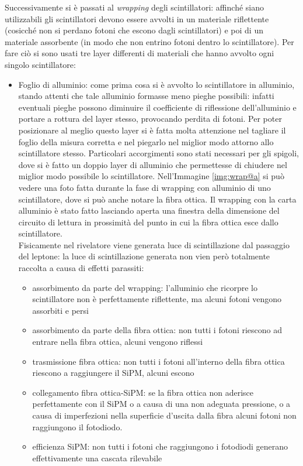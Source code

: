 Successivamente si è passati al \textit{wrapping} degli scintillatori: affinché siano utilizzabili gli scintillatori devono essere avvolti in un materiale riflettente
(cosicch\'e non si perdano fotoni che escono dagli scintillatori) e poi di un materiale assorbente (in modo che non entrino fotoni dentro lo scintillatore). Per fare
ciò si sono usati tre layer differenti di materiali che hanno avvolto ogni singolo scintillatore:
\begin{itemize}
\item Foglio di alluminio: come prima cosa si è avvolto lo scintillatore in alluminio, stando attenti che tale alluminio formasse meno pieghe possibili: infatti eventuali pieghe
possono diminuire il coefficiente di riflessione dell'alluminio e portare a rottura del layer stesso, provocando perdita di fotoni. Per poter posizionare al meglio
questo layer si è fatta molta attenzione nel tagliare il foglio della misura corretta e nel piegarlo nel miglior  modo attorno allo scintillatore stesso. Particolari
accorgimenti sono stati necessari per gli spigoli, dove si è fatto un doppio layer di alluminio che permettesse di chiudere nel miglior modo possibile lo
scintillatore. Nell'Immagine \ref{img:wrap@a} si può vedere una foto fatta durante la fase di wrapping con alluminio di uno scintillatore, dove si può anche notare la fibra
ottica. Il wrapping con la carta alluminio è stato fatto lasciando aperta una finestra della dimensione del circuito di lettura in prossimità del punto in cui la fibra
ottica esce dallo scintillatore.\\

Fisicamente nel rivelatore viene generata luce di scintillazione dal passaggio del leptone: la luce di scintillazione generata non vien però totalmente raccolta a causa di effetti parassiti:
\begin{itemize}
\item assorbimento da parte del wrapping: l'alluminio che ricorpre lo scintillatore non è perfettamente riflettente, ma alcuni fotoni vengono assorbiti e persi
\item assorbimento da parte della fibra ottica: non tutti i fotoni riescono ad entrare nella fibra ottica, alcuni vengono riflessi
\item trasmissione fibra ottica: non tutti i fotoni all'interno della fibra ottica riescono a raggiungere il SiPM, alcuni escono
\item collegamento fibra ottica-SiPM: se la fibra ottica non aderisce perfettamente con il SiPM o a causa di una non adeguata pressione, o a causa di imperfezioni nella superficie d'uscita dalla fibra alcuni fotoni non raggiungono il fotodiodo.
\item efficienza SiPM: non tutti i fotoni che raggiungono i fotodiodi generano effettivamente una cascata rilevabile
\end{itemize}


\end{itemize}
